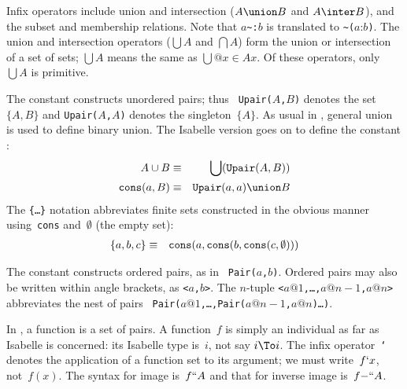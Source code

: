 Infix operators include union and intersection ($A\union B$ and $A\inter
B$), and the subset and membership relations.  Note that $a$\verb|~:|$b$ is
translated to \verb|~(|$a$:$b$\verb|)|.  The union and intersection
operators ($\bigcup A$ and $\bigcap A$) form the union or intersection of a
set of sets; $\bigcup A$ means the same as $\bigcup@{x\in A}x$.  Of these
operators, only $\bigcup A$ is primitive.

The constant  constructs unordered pairs; thus {\tt
Upair($A$,$B$)} denotes the set~$\{A,B\}$ and {\tt Upair($A$,$A$)} denotes
the singleton~$\{A\}$.  As usual in {\ZF}, general union is used to define
binary union.  The Isabelle version goes on to define the constant
:
\begin{eqnarray*}
   A\cup B              & \equiv &       \bigcup({\tt Upair}(A,B)) \\
   {\tt cons}(a,B)      & \equiv &        {\tt Upair}(a,a) \union B
\end{eqnarray*}
The {\tt\{\ldots\}} notation abbreviates finite sets constructed in the
obvious manner using~{\tt cons} and~$\emptyset$ (the empty set):
\begin{eqnarray*}
 \{a,b,c\} & \equiv & {\tt cons}(a,{\tt cons}(b,{\tt cons}(c,\emptyset)))
\end{eqnarray*}

The constant  constructs ordered pairs, as in {\tt
Pair($a$,$b$)}.  Ordered pairs may also be written within angle brackets,
as {\tt<$a$,$b$>}.  The $n$-tuple {\tt<$a@1$,\ldots,$a@{n-1}$,$a@n$>}
abbreviates the nest of pairs {\tt
  Pair($a@1$,\ldots,Pair($a@{n-1}$,$a@n$)\ldots)}. 

In {\ZF}, a function is a set of pairs.  A {\ZF} function~$f$ is simply an
individual as far as Isabelle is concerned: its Isabelle type is~$i$, not
say $i\To i$.  The infix operator~{\tt`} denotes the application of a
function set to its argument; we must write~$f{\tt`}x$, not~$f(x)$.  The
syntax for image is~$f{\tt``}A$ and that for inverse image is~$f{\tt-``}A$.


